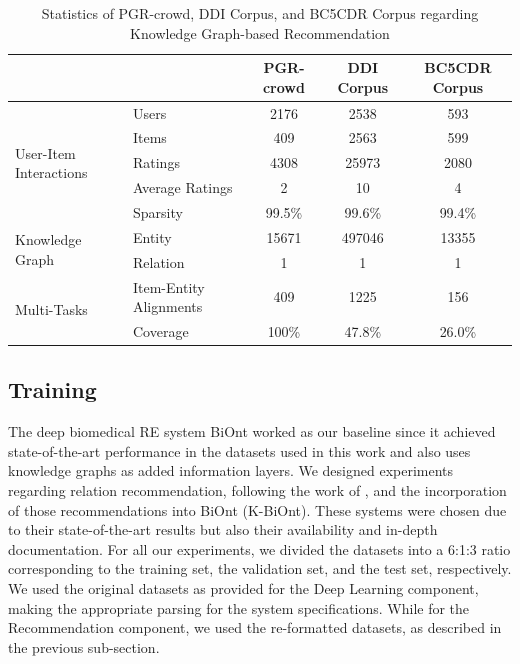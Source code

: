 \begin{table}[h]
\centering
  \caption[Statistics of PGR-crowd, DDI Corpus, and BC5CDR Corpus Regarding Knowledge Graph-based Recommendation]{Statistics of PGR-crowd, DDI Corpus, and BC5CDR Corpus regarding Knowledge Graph-based Recommendation}
  \begin{tabular}{llccc}
    \hline
    && PGR-crowd & DDI Corpus & BC5CDR Corpus\\
    \hline
    \multirow{5}{*}{User-Item Interactions} & Users & 2176 & 2538 & 593 \\
    & Items & 409 & 2563 & 599 \\
    & Ratings & 4308 & 25973 & 2080 \\
    & Average Ratings & 2 & 10 & 4 \\
    & Sparsity & 99.5\% & 99.6\% & 99.4\% \\
    \hline
    \multirow{2}{*}{Knowledge Graph} & Entity & 15671 & 497046 & 13355 \\
    & Relation & 1 & 1 & 1 \\
    \hline
    \multirow{2}{*}{Multi-Tasks} & Item-Entity Alignments & 409 & 1225 & 156\\
    & Coverage & 100\% & 47.8\% & 26.0\%\\
    \hline
  \end{tabular}
  \label{tab:rs_statistics}
\end{table}

\subsection{Training}

The deep biomedical RE system BiOnt \citep{sousa2020biont} worked as our baseline since it achieved state-of-the-art performance in the datasets used in this work and also uses knowledge graphs as added information layers. We designed experiments regarding relation recommendation, following the work of \cite{10.1145/3308558.3313705}, and the incorporation of those recommendations into BiOnt (K-BiOnt). These systems were chosen due to their state-of-the-art results but also their availability and in-depth documentation. For all our experiments, we divided the datasets into a 6:1:3 ratio corresponding to the training set, the validation set, and the test set, respectively. We used the original datasets as provided for the Deep Learning component, making the appropriate parsing for the system specifications. While for the Recommendation component, we used the re-formatted datasets, as described in the previous sub-section. 


